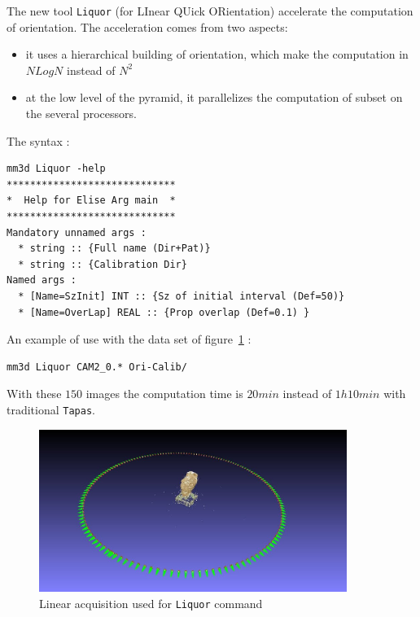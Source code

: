 The new tool {\tt Liquor} (for LInear QUick ORientation) accelerate the computation of orientation. The acceleration comes
from two aspects:

\begin{itemize}
   \item  it uses a hierarchical building of orientation, which make the computation in $N Log N$ instead of $N^2$
   \item  at the low level of the pyramid, it parallelizes the computation of subset on the several processors.
\end{itemize}

The syntax :

\begin{verbatim}
mm3d Liquor -help
*****************************
*  Help for Elise Arg main  *
*****************************
Mandatory unnamed args :
  * string :: {Full name (Dir+Pat)}
  * string :: {Calibration Dir}
Named args :
  * [Name=SzInit] INT :: {Sz of initial interval (Def=50)}
  * [Name=OverLap] REAL :: {Prop overlap (Def=0.1) }
\end{verbatim}

An example of use with the data set of figure~\ref{FIG:Liquor:DataMap} :

\begin{verbatim}
mm3d Liquor CAM2_0.* Ori-Calib/
\end{verbatim}


With these $150$ images the computation time is $20 min$ instead of $1h10min$ with traditional {\tt Tapas}.

\begin{figure}[H]
\begin{center}
\includegraphics[width=100mm]{FIGS/Ange/LineAcq.jpg}
\end{center}
\caption{Linear acquisition used for {\tt Liquor} command}
\label{FIG:Liquor:DataMap}
\end{figure}


